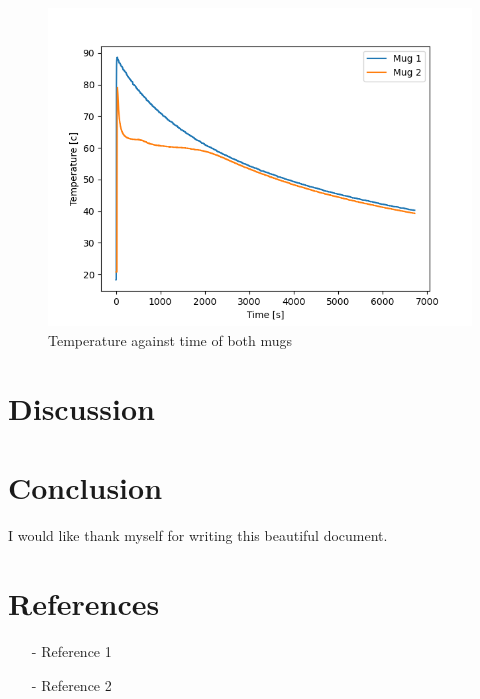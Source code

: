 \documentclass[reprint,english,notitlepage]{revtex4-2}
\begin{document}
\begin{figure}
  \includegraphics[scale=0.5]{temperature1.png}
  \caption{Temperature against time of both mugs}\label{figure}
\end{figure}

\section{Discussion}
\section{Conclusion}

\begin{acknowledgments}
I would like thank myself for writing this beautiful document.
\end{acknowledgments}


\section*{References}  %
\begin{itemize}
\item[-]Reference 1
\item[-]Reference 2
\end{itemize}
\end{document}
